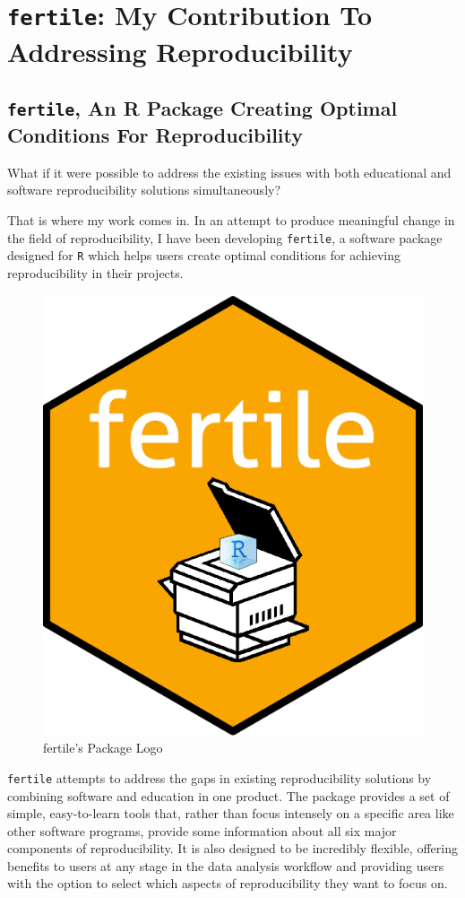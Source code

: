 \documentclass[12pt,twoside]{reedthesis}
\begin{document}
\hypertarget{my-solution}{%
\chapter{\texorpdfstring{\texttt{fertile}: My Contribution To Addressing Reproducibility}{fertile: My Contribution To Addressing Reproducibility}}\label{my-solution}}

\hypertarget{fertile-an-r-package-creating-optimal-conditions-for-reproducibility}{%
\section{\texorpdfstring{\texttt{fertile}, An R Package Creating Optimal Conditions For Reproducibility}{fertile, An R Package Creating Optimal Conditions For Reproducibility}}\label{fertile-an-r-package-creating-optimal-conditions-for-reproducibility}}

What if it were possible to address the existing issues with both educational and software reproducibility solutions simultaneously?

That is where my work comes in. In an attempt to produce meaningful change in the field of reproducibility, I have been developing \texttt{fertile}, a software package designed for \texttt{R} which helps users create optimal conditions for achieving reproducibility in their projects.
\begin{figure}

{\centering \includegraphics[width=0.3\linewidth]{figure/fertile-hex} 

}

\caption{fertile's Package Logo}\label{fig:unnamed-chunk-7}
\end{figure}
\texttt{fertile} attempts to address the gaps in existing reproducibility solutions by combining software and education in one product. The package provides a set of simple, easy-to-learn tools that, rather than focus intensely on a specific area like other software programs, provide some information about all six major components of reproducibility. It is also designed to be incredibly flexible, offering benefits to users at any stage in the data analysis workflow and providing users with the option to select which aspects of reproducibility they want to focus on.
\end{document}
